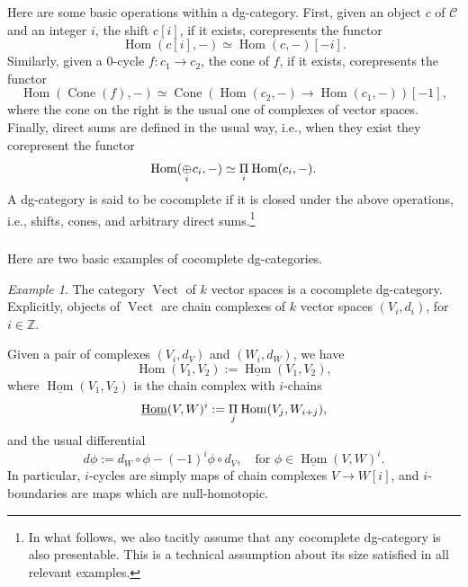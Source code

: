 \documentclass[10pt]{amsart}
\newcommand{\on}{\operatorname}
\newcommand{\Vect}{\on{Vect}}
\theoremstyle{remark}
\newtheorem{re}[subsubsection]{Remark}
\newtheorem{ex}[subsubsection]{Example}
\newcommand{\Hom}{\operatorname{Hom}}
\numberwithin{equation}{section}
\newcommand{\sC}{\mathscr{C}}
\begin{document}
	
	Here are some basic operations within a dg-category. First, given an object 
	$c$ of $\sC$ and an integer $i$, the shift $c[i]$, if it exists, 
	corepresents the functor 
	\[
	\Hom(c[i], -) \simeq \Hom(c,-)[-i]. 
	\]
	Similarly, given a 0-cycle $f: c_1 \rightarrow c_2$, the cone of $f$, if it 
	exists, corepresents the functor 
	\[
	   \Hom( \on{Cone}(f), -) \simeq \on{Cone}( \Hom(c_2, -) \rightarrow 
	   \Hom(c_1, -))[-1],
	\]
	where the cone on the right is the usual one of complexes of vector spaces. 
	Finally, direct sums are defined in the usual way, i.e., when they exist 
	they corepresent the functor
%
\[
   \Hom( \underset{i}{\oplus} \hspace{.2mm} c_i, -) \simeq \underset{i}\Pi 
   \hspace{.2mm} \Hom( c_i, -).
\]
%	
  A dg-category is said to be cocomplete if it is closed under the above 
  operations, i.e., shifts, cones, and arbitrary direct sums.\footnote{In what 
  follows, 
  we also tacitly assume that any cocomplete dg-category is also presentable. This is a technical assumption about its size satisfied in all relevant examples.} 
  

  
  
  \subsubsection{} Here are two basic examples of cocomplete dg-categories. 
  
  \begin{ex} The category $\Vect$ of $k$ vector spaces is a cocomplete 
  dg-category. Explicitly, objects of 
  $\Vect$ are chain complexes of $k$ vector spaces $(V_i, d_i)$, for $i \in 
  \mathbb{Z}$. 
  
  Given a pair of complexes 
  $(V_i, d_V)$ and $(W_i, d_W)$, we have 
  \[
  \Hom(V_1, V_2) := \underline{\Hom}(V_1, V_2),
  \]
  where $\underline{\Hom}(V_1, V_2)$ is the chain complex with $i$-chains 
  \[
      \underline{\Hom}(V, W)^i := \underset{j}{\Pi} \hspace{.2mm} \Hom(V_j, 
      W_{i+j}),
  \]
  and the usual differential
  \[
       d \phi := d_W \circ \phi -(-1)^i \phi \circ d_V, \quad \text{for } \phi 
       \in \underline{\Hom}(V,W)^i. 
  \]
  In particular, $i$-cycles are simply maps of chain complexes $V \rightarrow 
  W[i]$, and $i$-boundaries are maps which are null-homotopic. \label{e:dgvect}
  \end{ex}
\end{document}
